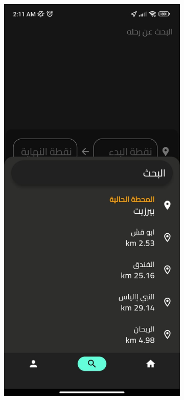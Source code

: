 \documentclass[a4paper, 12pt]{report} %
\begin{document}
            \begin{figure}[H]
                \centering
                \begin{subfigure}{0.31\textwidth}
                    \includegraphics[width=\linewidth]{Images/trip_search_1.jpg}

\end{subfigure}
\end{figure}
\end{document}
